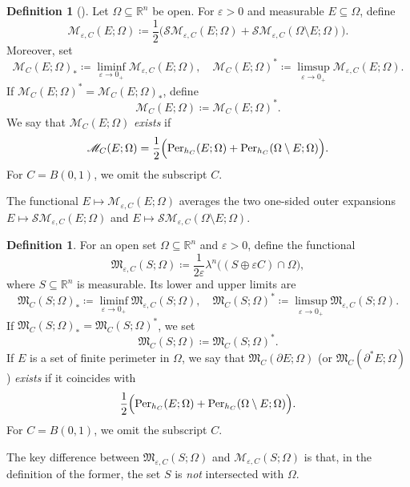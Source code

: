 \documentclass[pdflatex,sn-mathphys-num]{sn-jnl}
\theoremstyle{plain}
\theoremstyle{definition}
\newtheorem{definition}[theorem]{Definition}
\begin{document}
\begin{definition}[\cite{chambolle}]
Let $\Omega\subseteq\mathbb{R}^n$ be open. For $\varepsilon>0$ and measurable $E\subseteq\Omega$, define
\[
    \mathscr{M}_{\varepsilon, C}(E; \Omega) \coloneqq \frac{1}{2} \Big(\mathcal{SM}_{\varepsilon, C}(E; \Omega) + \mathcal{SM}_{\varepsilon, C}(\Omega\setminus E; \Omega)\Big).
\]
Moreover, set
\[
    \mathscr{M}_{C}(E; \Omega)_* \coloneqq \liminf_{\varepsilon\to 0_+} \mathscr{M}_{\varepsilon, C}(E; \Omega), \quad
    \mathscr{M}_{C}(E; \Omega)^* \coloneqq \limsup_{\varepsilon\to 0_+} \mathscr{M}_{\varepsilon, C}(E; \Omega).
\]
If $\mathscr{M}_{C}(E; \Omega)^* = \mathscr{M}_{C}(E; \Omega)_*$, define
\[
    \mathscr{M}_{C}(E; \Omega) \coloneqq \mathscr{M}_{C}(E; \Omega)^*.
\]
We say that $\mathscr{M}_{C}(E; \Omega)$ \emph{exists} if
\[
    \mathscr{M}_{C}(E; \Omega) = \frac{1}{2}\Big(\textup{Per}_{h_C}(E; \Omega) + \textup{Per}_{h_C}(\Omega \setminus E; \Omega)\Big).
\]
For $C=B(0,1)$, we omit the subscript $C$.
\end{definition}

The functional $E\mapsto\mathscr{M}_{\varepsilon, C}(E; \Omega)$ averages the two one-sided outer expansions $E\mapsto\mathcal{SM}_{\varepsilon, C}(E; \Omega)$ and $E\mapsto\mathcal{SM}_{\varepsilon, C}(\Omega\setminus E; \Omega).$

\begin{definition}
For an open set $\Omega\subseteq \mathbb{R}^n$ and $\varepsilon>0$, define the functional
\[
    \mathfrak{M}_{\varepsilon, C}(S; \Omega) \coloneqq \frac{1}{2\varepsilon} \lambda^n \big((S \oplus \varepsilon C) \cap \Omega\big),
\]
where $S\subseteq\mathbb{R}^n$ is measurable. Its lower and upper limits are
\[
    \mathfrak{M}_{C}(S; \Omega)_* \coloneqq \liminf_{\varepsilon\to0_+} \mathfrak{M}_{\varepsilon, C}(S; \Omega), \quad
    \mathfrak{M}_{C}(S; \Omega)^* \coloneqq \limsup_{\varepsilon\to0_+} \mathfrak{M}_{\varepsilon, C}(S; \Omega).
\]
If $\mathfrak{M}_{C}(S; \Omega)_* = \mathfrak{M}_{C}(S; \Omega)^*$, we set
\[
    \mathfrak{M}_{C}(S; \Omega) \coloneqq \mathfrak{M}_{C}(S; \Omega)^*.
\]
If $E$ is a set of finite perimeter in $\Omega$, we say that $\mathfrak{M}_{C}(\partial E; \Omega)$  (or $\mathfrak{M}_{C}(\partial^* E; \Omega)$) \emph{exists} if
it coincides with \[ \frac{1}{2}\Big(\textup{Per}_{h_C}(E; \Omega) + \textup{Per}_{h_C}(\Omega \setminus E; \Omega)\Big).
\]
For $C=B(0,1)$, we omit the subscript $C$.
\end{definition}

The key difference between $\mathfrak{M}_{\varepsilon, C}(S; \Omega)$ and $\mathcal{M}_{\varepsilon, C}(S; \Omega)$ is that, in the definition of the former, the set $S$ is \emph{not} intersected with $\Omega$.
\end{document}
